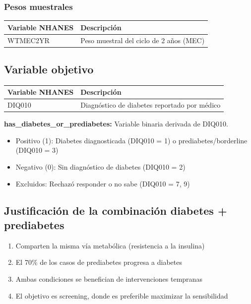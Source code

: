 \documentclass[12pt, a4paper]{report}
\begin{document}
\subsubsection{Pesos muestrales}

\begin{table}[H]
\centering
\begin{tabular}{ll}
\toprule
\textbf{Variable NHANES} & \textbf{Descripción} \\
\midrule
WTMEC2YR & Peso muestral del ciclo de 2 años (MEC) \\
\bottomrule
\end{tabular}
\end{table}

\subsection{Variable objetivo}

\begin{table}[H]
\centering
\begin{tabular}{ll}
\toprule
\textbf{Variable NHANES} & \textbf{Descripción} \\
\midrule
DIQ010 & Diagnóstico de diabetes reportado por médico \\
\bottomrule
\end{tabular}
\end{table}

\textbf{has\_diabetes\_or\_prediabetes:} Variable binaria derivada de DIQ010.

\begin{itemize}
    \item Positivo (1): Diabetes diagnosticada (DIQ010 = 1) o prediabetes/borderline (DIQ010 = 3)
    \item Negativo (0): Sin diagnóstico de diabetes (DIQ010 = 2)
    \item Excluidos: Rechazó responder o no sabe (DIQ010 = 7, 9)
\end{itemize}

\subsection*{Justificación de la combinación diabetes + prediabetes}
\begin{enumerate}
    \item Comparten la misma vía metabólica (resistencia a la insulina)
    \item El 70\% de los casos de prediabetes progresa a diabetes
    \item Ambas condiciones se benefician de intervenciones tempranas
    \item El objetivo es screening, donde es preferible maximizar la sensibilidad
\end{enumerate}
\end{document}
